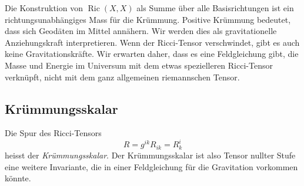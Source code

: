 Die Konstruktion von $\operatorname{Ric}(X,X)$ als Summe über alle
Basisrichtungen ist ein richtungsunabhängiges Mass für die
Krümmung.
Positive Krümmung bedeutet, dass sich Geodäten im Mittel annähern.
Wir werden dies als gravitationelle Anziehungskraft interpretieren.
Wenn der Ricci-Tensor verschwindet, gibt es auch keine Gravitationskräfte.
Wir erwarten daher, dass es eine Feldgleichung gibt, die Masse und
Energie im Universum mit dem etwas spezielleren Ricci-Tensor verknüpft,
nicht mit dem ganz allgemeinen riemannschen Tensor.

%
%
\subsection{Krümmungsskalar}
Die Spur des Ricci-Tensors
\[
R
=
g^{ik}R_{ik}
=
R^i_k
\]
heisst der {\em Krümmungsskalar}.
Der Krümmungsskalar ist also Tensor nullter Stufe eine weitere Invariante,
die in einer Feldgleichung für die Gravitation vorkommen könnte.
